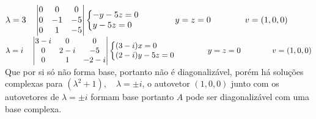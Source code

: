 \documentclass[12pt]{article}
\begin{document}
$\lambda=3\quad\begin{vmatrix}0&0&0\\0&-1&-5\\0&1&-5\end{vmatrix}\left\{\begin{array}{@{}l@{}}-y-5z=0\\y-5z=0\end{array}\right.\qquad\qquad y=z=0\qquad\qquad v=(1,0,0)$\\

$\lambda=i\quad\begin{vmatrix}3-i&0&0\\0&2-i&-5\\0&1&-2-i\end{vmatrix}\left\{\begin{array}{@{}l@{}}(3-i)x=0\\(2-i)y-5z=0\end{array}\right.\qquad\qquad y=z=0\qquad\qquad v=(1,0,0)$\\

Que por si só não forma base, portanto não é diagonalizável, porém há soluções complexas para $(\lambda^{2}+1),\quad\lambda=\pm i$, o autovetor $(1,0,0)$ junto com os autovetores de $\lambda=\pm i$ formam base portanto $A$ pode ser diagonalizável com uma base complexa.\\ 
\end{document}
